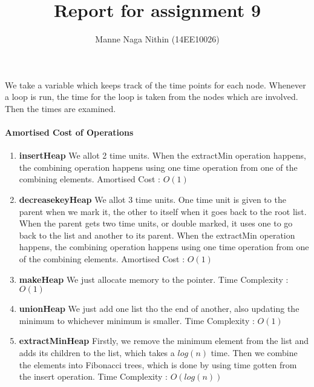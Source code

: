 \documentclass[a4paper,11pt]{article}
\title{Report for assignment 9}
\author{Manne Naga Nithin (14EE10026)}
\begin{document}
\maketitle
We take a variable which keeps track of the time points for each node. Whenever a loop is run, the time for the loop is taken from the nodes which are involved. Then the times are examined.
\paragraph{Amortised Cost of Operations}
\begin{enumerate}

 \item \textbf{insertHeap}\newline
 We allot 2 time units. When the extractMin operation happens, the combining operation happens using one time operation from one of the combining elements.\newline
 Amortised Cost : $O(1)$
 \item \textbf{decreasekeyHeap}\newline
 We allot 3 time units. One time unit is given to the parent when we mark it, the other to itself when it goes back to the root list. When the parent gets two time units, or double marked, it uses one to go back to the list and another to its parent. When the extractMin operation happens, the combining operation happens using one time operation from one of the combining elements.\newline
 Amortised Cost : $O(1)$
 \item \textbf{makeHeap}\newline
 We just allocate memory to the pointer.\newline
 Time Complexity : $O(1)$
 \item \textbf{unionHeap}\newline
 We just add one list tho the end of another, also updating the minimum to whichever minimum is smaller.\newline
 Time Complexity : $O(1)$
 \item \textbf{extractMinHeap}\newline
 Firstly, we remove the minimum element from the list and adds its children to the list, which takes a $log(n)$ time. Then we combine the elements into Fibonacci trees, which is done by using time gotten from the insert operation.\newline
 Time Complexity : $O(log(n))$
 
 
 


\end{enumerate}
\end{document}
